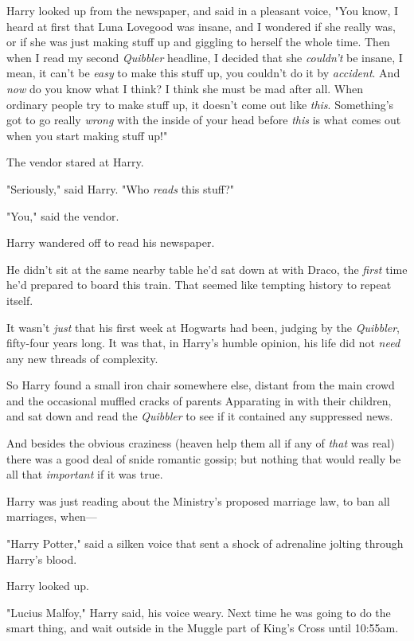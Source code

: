 Harry looked up from the newspaper, and said in a pleasant voice, "You know, I
heard at first that Luna Lovegood was insane, and I wondered if she really was,
or if she was just making stuff up and giggling to herself the whole time. Then
when I read my second \emph{Quibbler} headline, I decided that she
\emph{couldn't} be insane, I mean, it can't be \emph{easy} to make this stuff
up, you couldn't do it by \emph{accident}. And \emph{now} do you know what I
think? I think she must be mad after all. When ordinary people try to make
stuff up, it doesn't come out like \emph{this}. Something's got to go really
\emph{wrong} with the inside of your head before \emph{this} is what comes out
when you start making stuff up!"

The vendor stared at Harry.

"Seriously," said Harry. "Who \emph{reads} this stuff?"

"You," said the vendor.

Harry wandered off to read his newspaper.

He didn't sit at the same nearby table he'd sat down at with Draco, the
\emph{first} time he'd prepared to board this train. That seemed like tempting
history to repeat itself.

It wasn't \emph{just} that his first week at Hogwarts had been, judging by the
\emph{Quibbler}, fifty-four years long. It was that, in Harry's humble opinion,
his life did not \emph{need} any new threads of complexity.

So Harry found a small iron chair somewhere else, distant from the main crowd
and the occasional muffled cracks of parents Apparating in with their children,
and sat down and read the \emph{Quibbler} to see if it contained any suppressed
news.

And besides the obvious craziness (heaven help them all if any of \emph{that}
was real) there was a good deal of snide romantic gossip; but nothing that
would really be all that \emph{important} if it was true.

Harry was just reading about the Ministry's proposed marriage law, to ban all
marriages, when---

"Harry Potter," said a silken voice that sent a shock of adrenaline jolting
through Harry's blood.

Harry looked up.

"Lucius Malfoy," Harry said, his voice weary. Next time he was going to do the
smart thing, and wait outside in the Muggle part of King's Cross until 10:55am.

